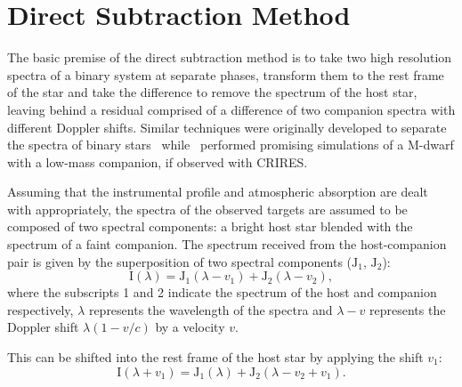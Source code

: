 
\section{Direct Subtraction Method}
\label{sec:direct-subtraction}
The basic premise of the direct subtraction method is to take two high resolution spectra of a binary system at separate phases, transform them to the rest frame of the star and take the difference to remove the spectrum of the host star, leaving behind a residual comprised of a difference of two companion spectra with different Doppler shifts.
Similar techniques were originally developed to separate the spectra of binary stars~\citep[e.g.][]{ferluga_separating_1997} while~\citet{kostogryz_spectral_2013} performed promising simulations of a {M-dwarf} with a low-mass companion, if observed with {CRIRES}.

Assuming that the instrumental profile and atmospheric absorption are dealt with appropriately, the spectra of the observed targets are assumed to be composed of two spectral components: a bright host star blended with the spectrum of a faint companion.
The spectrum received from the host-companion pair is given by the superposition of two spectral components (\(\textrm{J}_{1}\), \(\textrm{J}_{2}\)):
\begin{equation}
\textrm{I}(\lambda) = \textrm{J}_{1}(\lambda - v_{1}) + \textrm{J}_{2}(\lambda - v_{2}),
\end{equation}
where the subscripts 1 and 2 indicate the spectrum of the host and companion respectively, \(\lambda\) represents the wavelength of the spectra and \(\lambda-v\) represents the Doppler shift \(\lambda(1-v/c)\) by a velocity \(v\).

This can be shifted into the rest frame of the host star by applying the shift \(v_1\):
\begin{equation}
\textrm{I}(\lambda + v_{1}) = \textrm{J}_{1}(\lambda) + \textrm{J}_{2}(\lambda - v_{2} + v_{1}).
\end{equation}

